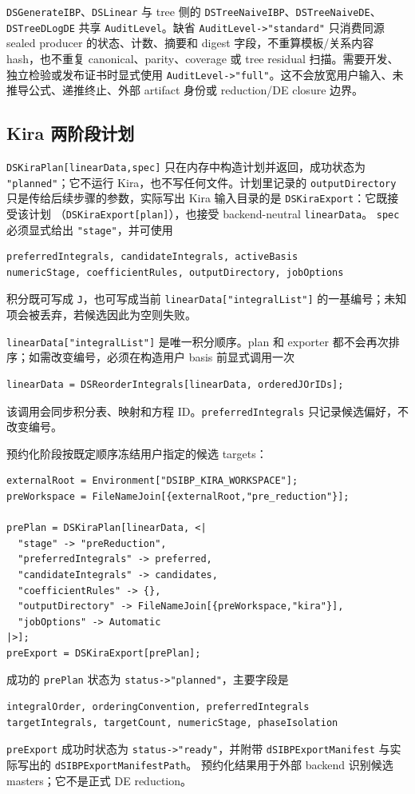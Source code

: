 ﻿\documentclass[a4paper,11pt]{article}
\begin{document}
\texttt{DSGenerateIBP}、\allowbreak\texttt{DSLinear} 与 tree 侧的
\texttt{DSTreeNaiveIBP}、\allowbreak\texttt{DSTreeNaiveDE}、\allowbreak\texttt{DSTreeDLogDE} 共享
\texttt{AuditLevel}。缺省 \texttt{AuditLevel->"standard"} 只消费同源 sealed producer 的状态、计数、摘要和 digest 字段，不重算模板/关系内容 hash，也不重复 canonical、parity、coverage 或 tree residual 扫描。需要开发、独立检验或发布证书时显式使用 \texttt{AuditLevel->"full"}。这不会放宽用户输入、未推导公式、递推终止、外部 artifact 身份或 reduction/DE closure 边界。

\subsection{Kira 两阶段计划}

\texttt{DSKiraPlan[linearData,spec]} 只在内存中构造计划并返回，成功状态为
\texttt{"planned"}；它不运行 Kira，也不写任何文件。计划里记录的 \texttt{outputDirectory}
只是传给后续步骤的参数，实际写出 Kira 输入目录的是 \texttt{DSKiraExport}：它既接受该计划
（\texttt{DSKiraExport[plan]}），也接受 backend-neutral \texttt{linearData}。
\texttt{spec} 必须显式给出 \texttt{"stage"}，并可使用
\begin{verbatim}
preferredIntegrals, candidateIntegrals, activeBasis
numericStage, coefficientRules, outputDirectory, jobOptions
\end{verbatim}
积分既可写成 \texttt{J}，也可写成当前
\texttt{linearData["integralList"]} 的一基编号；未知项会被丢弃，若候选因此为空则失败。

\texttt{linearData["integralList"]} 是唯一积分顺序。plan 和 exporter 都不会再次排序；如需改变编号，必须在构造用户 basis 前显式调用一次
\begin{verbatim}
linearData = DSReorderIntegrals[linearData, orderedJOrIDs];
\end{verbatim}
该调用会同步积分表、映射和方程 ID。\texttt{preferredIntegrals} 只记录候选偏好，不改变编号。

预约化阶段按既定顺序冻结用户指定的候选 targets：
\begin{verbatim}
externalRoot = Environment["DSIBP_KIRA_WORKSPACE"];
preWorkspace = FileNameJoin[{externalRoot,"pre_reduction"}];

prePlan = DSKiraPlan[linearData, <|
  "stage" -> "preReduction",
  "preferredIntegrals" -> preferred,
  "candidateIntegrals" -> candidates,
  "coefficientRules" -> {},
  "outputDirectory" -> FileNameJoin[{preWorkspace,"kira"}],
  "jobOptions" -> Automatic
|>];
preExport = DSKiraExport[prePlan];
\end{verbatim}
成功的 \texttt{prePlan} 状态为 \texttt{status->"planned"}，主要字段是
\begin{verbatim}
integralOrder, orderingConvention, preferredIntegrals
targetIntegrals, targetCount, numericStage, phaseIsolation
\end{verbatim}
\texttt{preExport} 成功时状态为 \texttt{status->"ready"}，并附带
\texttt{dSIBPExportManifest} 与实际写出的 \texttt{dSIBPExportManifestPath}。
预约化结果用于外部 backend 识别候选 masters；它不是正式 DE reduction。
\end{document}
